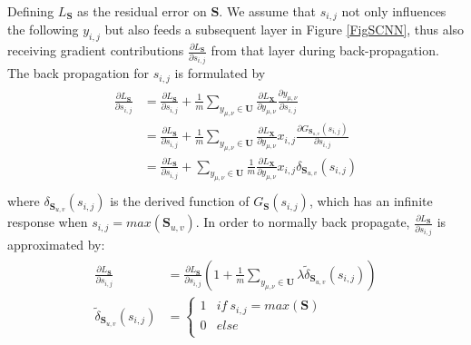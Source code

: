 
Defining $L_\mathbf{S}$ as the residual error on $\mathbf{S}$.
We assume that $s_{i,j}$ not only influences the following $y_{i,j}$ but also feeds a subsequent layer in Figure \ref{FigSCNN}, thus also receiving gradient contributions $\frac{\partial L_\mathbf{S}}{\partial s_{i,j}}$ from that layer during back-propagation.
The back propagation for $s_{i,j}$ is formulated by
%
\begin{eqnarray}\label{bps}
\begin{aligned}
\frac{\partial L_\mathbf{S}}{\partial s_{i,j}}&=\frac{\partial L_\mathbf{S}}{\partial s_{i,j}}+\frac{1}{m}\sum_{y_{\mu,\nu}\in\mathbf{U}}\frac{\partial L_\mathbf{X}}{\partial y_{\mu,\nu}}\frac{\partial y_{\mu,\nu}}{\partial s_{i,j}}\\
&=\frac{\partial L_\mathbf{S}}{\partial s_{i,j}}+\frac{1}{m}\sum_{y_{\mu,\nu}\in\mathbf{U}}\frac{\partial L_\mathbf{X}}{\partial y_{\mu,\nu}}x_{i,j}\frac{\partial G_{\mathbf{S}_{u,v}}(s_{i,j})}{\partial s_{i,j}}\\
&=\frac{\partial L_\mathbf{S}}{\partial s_{i,j}}+\sum_{y_{\mu,\nu}\in\mathbf{U}}\frac{1}{m}\frac{\partial L_\mathbf{X}}{\partial y_{\mu,\nu}}x_{i,j}\delta_{\mathbf{S}_{u,v}}(s_{i,j})\\
\end{aligned}
\end{eqnarray}
where $\delta_{\mathbf{S}_{u,v}}(s_{i,j})$ is the derived function of $G_\mathbf{S}(s_{i,j})$, which has an infinite response when $s_{i,j}=max(\mathbf{S}_{u,v})$.
In order to normally back propagate, $\frac{\partial L_\mathbf{S}}{\partial s_{i,j}}$ is approximated by:
\begin{eqnarray}\label{dG}
\begin{aligned}
\frac{\partial L_\mathbf{S}}{\partial s_{i,j}}&= \frac{\partial L_\mathbf{S}}{\partial s_{i,j}}(1+\frac{1}{m}\sum_{y_{\mu,\nu}\in\mathbf{U}}\lambda\widetilde{\delta}_{\mathbf{S}_{u,v}}(s_{i,j}))\\
\widetilde{\delta}_{\mathbf{S}_{u,v}}(s_{i,j})&=\left\{\begin{array}{cc}
1&if~s_{i,j}=max(\mathbf{S})\\
0&else\\
\end{array}\right.
\end{aligned}
\end{eqnarray}

